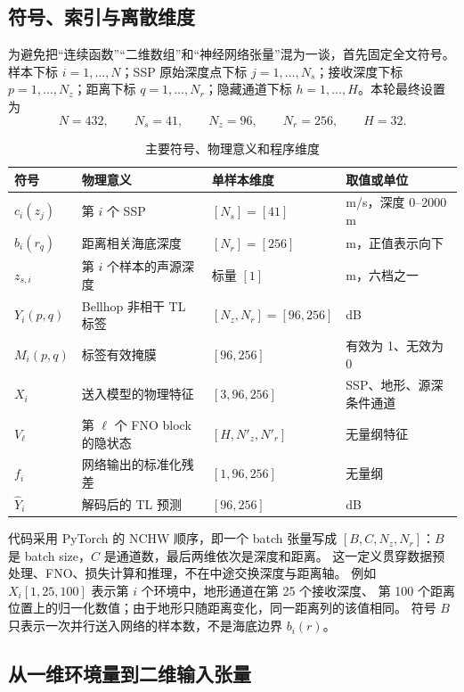 \documentclass[UTF8,11pt]{ctexart}
\begin{document}
\subsection{符号、索引与离散维度}

为避免把“连续函数”“二维数组”和“神经网络张量”混为一谈，首先固定全文符号。样本下标
$i=1,\ldots,N$；SSP 原始深度点下标 $j=1,\ldots,N_s$；接收深度下标
$p=1,\ldots,N_z$；距离下标 $q=1,\ldots,N_r$；隐藏通道下标
$h=1,\ldots,H$。本轮最终设置为
\begin{equation}
  N=432,\qquad N_s=41,\qquad N_z=96,\qquad N_r=256,\qquad H=32.
\end{equation}

\begin{table}[H]
\centering
\caption{主要符号、物理意义和程序维度}
\begin{tabularx}{\textwidth}{L{2.2cm}L{3.2cm}L{3.0cm}Y}
\toprule
符号 & 物理意义 & 单样本维度 & 取值或单位 \\
\midrule
$c_i(z_j)$ & 第 $i$ 个 SSP & $[N_s]=[41]$ & m/s，深度 0--2000 m \\
$b_i(r_q)$ & 距离相关海底深度 & $[N_r]=[256]$ & m，正值表示向下 \\
$z_{s,i}$ & 第 $i$ 个样本的声源深度 & 标量 $[1]$ & m，六档之一 \\
$Y_i(p,q)$ & Bellhop 非相干 TL 标签 & $[N_z,N_r]=[96,256]$ & dB \\
$M_i(p,q)$ & 标签有效掩膜 & $[96,256]$ & 有效为 1、无效为 0 \\
$X_i$ & 送入模型的物理特征 & $[3,96,256]$ & SSP、地形、源深条件通道 \\
$V_\ell$ & 第 $\ell$ 个 FNO block 的隐状态 & $[H,N'_z,N'_r]$ & 无量纲特征 \\
$f_i$ & 网络输出的标准化残差 & $[1,96,256]$ & 无量纲 \\
$\hat Y_i$ & 解码后的 TL 预测 & $[96,256]$ & dB \\
\bottomrule
\end{tabularx}
\end{table}

代码采用 PyTorch 的 NCHW 顺序，即一个 batch 张量写成
$[B,C,N_z,N_r]$：$B$ 是 batch size，$C$ 是通道数，最后两维依次是深度和距离。
这一定义贯穿数据预处理、FNO、损失计算和推理，不在中途交换深度与距离轴。
例如 $X_i[1,25,100]$ 表示第 $i$ 个环境中，地形通道在第 25 个接收深度、
第 100 个距离位置上的归一化数值；由于地形只随距离变化，同一距离列的该值相同。
符号 $B$ 只表示一次并行送入网络的样本数，不是海底边界 $b_i(r)$。

\subsection{从一维环境量到二维输入张量}
\end{document}
